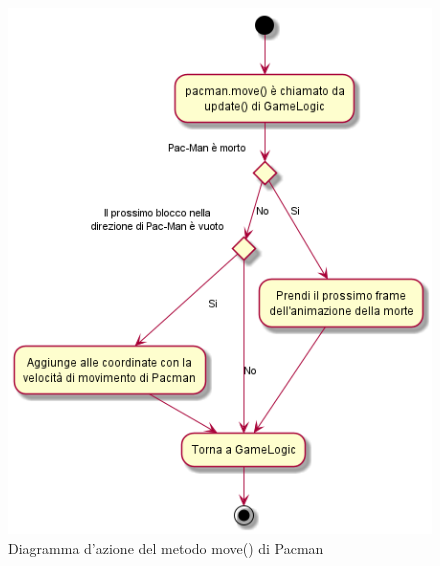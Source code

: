 \documentclass[12pt,a4paper]{report}
\begin{document}
\begin{figure}[tbp]
\centering
 \includegraphics[width=\textwidth,height=0.4\textheight,keepaspectratio]{pacman_move}
  \caption{Diagramma d'azione del metodo move() di Pacman}
  \label{fig:pacman_move}
\vspace*{\floatsep}

\end{figure}
\end{document}
